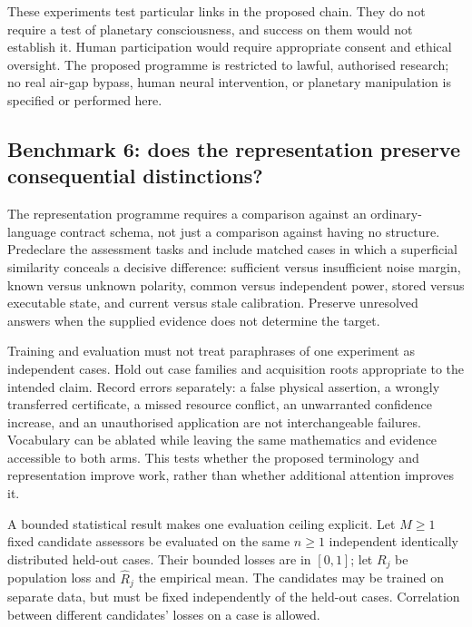 \documentclass[11pt,a4paper]{article}
\theoremstyle{definition}
\theoremstyle{remark}
\begin{document}
These experiments test particular links in the proposed chain. They do not require a test of planetary consciousness, and success on them would not establish it. Human participation would require appropriate consent and ethical oversight. The proposed programme is restricted to lawful, authorised research; no real air-gap bypass, human neural intervention, or planetary manipulation is specified or performed here.

\subsection{Benchmark 6: does the representation preserve consequential distinctions?}\label{sec:reprbench}
The representation programme requires a comparison against an ordinary-language contract schema, not just a comparison against having no structure. Predeclare the assessment tasks and include matched cases in which a superficial similarity conceals a decisive difference: sufficient versus insufficient noise margin, known versus unknown polarity, common versus independent power, stored versus executable state, and current versus stale calibration. Preserve unresolved answers when the supplied evidence does not determine the target.

Training and evaluation must not treat paraphrases of one experiment as independent cases. Hold out case families and acquisition roots appropriate to the intended claim. Record errors separately: a false physical assertion, a wrongly transferred certificate, a missed resource conflict, an unwarranted confidence increase, and an unauthorised application are not interchangeable failures. Vocabulary can be ablated while leaving the same mathematics and evidence accessible to both arms. This tests whether the proposed terminology and representation improve work, rather than whether additional attention improves it.

A bounded statistical result makes one evaluation ceiling explicit. Let $M\geq1$ fixed candidate assessors be evaluated on the same $n\geq1$ independent identically distributed held-out cases. Their bounded losses are in $[0,1]$; let $R_j$ be population loss and $\hat R_j$ the empirical mean. The candidates may be trained on separate data, but must be fixed independently of the held-out cases. Correlation between different candidates' losses on a case is allowed.
\end{document}

